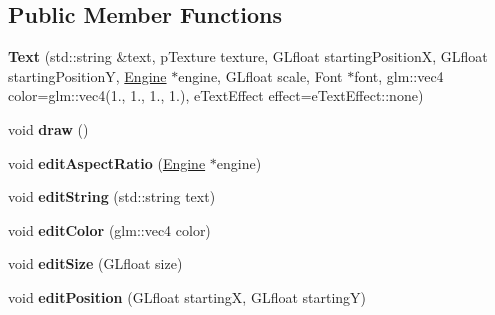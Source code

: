 \subsection*{Public Member Functions}
\begin{DoxyCompactItemize}
\item 
\hypertarget{classfillwave_1_1models_1_1Text_a1c6237986709c1211eb80c2ad8b7dd63}{}{\bfseries Text} (std\+::string \&text, p\+Texture texture, G\+Lfloat starting\+Position\+X, G\+Lfloat starting\+Position\+Y, \hyperlink{classfillwave_1_1Engine}{Engine} $\ast$engine, G\+Lfloat scale, Font $\ast$font, glm\+::vec4 color=glm\+::vec4(1., 1., 1., 1.), e\+Text\+Effect effect=e\+Text\+Effect\+::none)\label{classfillwave_1_1models_1_1Text_a1c6237986709c1211eb80c2ad8b7dd63}

\item 
\hypertarget{classfillwave_1_1models_1_1Text_a7f92f8cbce01e994b04a7c3e3677d596}{}void {\bfseries draw} ()\label{classfillwave_1_1models_1_1Text_a7f92f8cbce01e994b04a7c3e3677d596}

\item 
\hypertarget{classfillwave_1_1models_1_1Text_a2a4dd2d9481561125b697a2529ec9d52}{}void {\bfseries edit\+Aspect\+Ratio} (\hyperlink{classfillwave_1_1Engine}{Engine} $\ast$engine)\label{classfillwave_1_1models_1_1Text_a2a4dd2d9481561125b697a2529ec9d52}

\item 
\hypertarget{classfillwave_1_1models_1_1Text_ae5d856127f5e484e56166c5d8b28f60d}{}void {\bfseries edit\+String} (std\+::string text)\label{classfillwave_1_1models_1_1Text_ae5d856127f5e484e56166c5d8b28f60d}

\item 
\hypertarget{classfillwave_1_1models_1_1Text_a5b21b52d62c9e55e9e821f2c9da1c351}{}void {\bfseries edit\+Color} (glm\+::vec4 color)\label{classfillwave_1_1models_1_1Text_a5b21b52d62c9e55e9e821f2c9da1c351}

\item 
\hypertarget{classfillwave_1_1models_1_1Text_a8a298c4f93cb403ba014e80b06217f72}{}void {\bfseries edit\+Size} (G\+Lfloat size)\label{classfillwave_1_1models_1_1Text_a8a298c4f93cb403ba014e80b06217f72}

\item 
\hypertarget{classfillwave_1_1models_1_1Text_a4d50c3e3d99dc3108037ba0e3cf39dff}{}void {\bfseries edit\+Position} (G\+Lfloat starting\+X, G\+Lfloat starting\+Y)\label{classfillwave_1_1models_1_1Text_a4d50c3e3d99dc3108037ba0e3cf39dff}

\end{DoxyCompactItemize}
